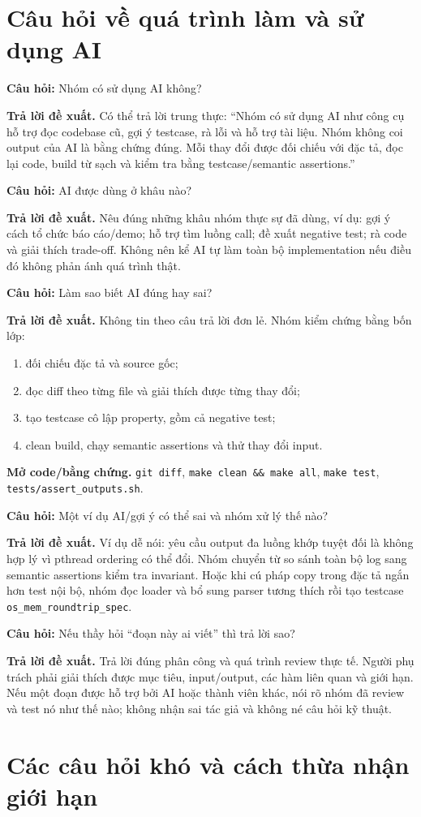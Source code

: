 \documentclass[11pt,a4paper]{article}
\newcommand{\code}[1]{\texttt{\color{navy}#1}}
\newcommand{\q}[1]{%
  \vspace{0.55em}\noindent
  \colorbox{pale}{\parbox{\dimexpr\textwidth-2\fboxsep}{\textbf{\color{navy}Câu hỏi:} #1}}%
  \par\vspace{0.3em}}
\newcommand{\ans}[1]{\textbf{\color{cyan}Trả lời đề xuất.} #1\par}
\newcommand{\proofcode}[1]{\textbf{\color{orange}Mở code/bằng chứng.} #1\par}
\begin{document}
\section{Câu hỏi về quá trình làm và sử dụng AI}

\q{Nhóm có sử dụng AI không?}
\ans{Có thể trả lời trung thực: ``Nhóm có sử dụng AI như công cụ hỗ trợ đọc
codebase cũ, gợi ý testcase, rà lỗi và hỗ trợ tài liệu. Nhóm không coi output
của AI là bằng chứng đúng. Mỗi thay đổi được đối chiếu với đặc tả, đọc lại code,
build từ sạch và kiểm tra bằng testcase/semantic assertions.''}

\q{AI được dùng ở khâu nào?}
\ans{Nêu đúng những khâu nhóm thực sự đã dùng, ví dụ: gợi ý cách tổ chức báo
cáo/demo; hỗ trợ tìm luồng call; đề xuất negative test; rà code và giải thích
trade-off. Không nên kể AI tự làm toàn bộ implementation nếu điều đó không phản
ánh quá trình thật.}

\q{Làm sao biết AI đúng hay sai?}
\ans{Không tin theo câu trả lời đơn lẻ. Nhóm kiểm chứng bằng bốn lớp:
\begin{enumerate}
  \item đối chiếu đặc tả và source gốc;
  \item đọc diff theo từng file và giải thích được từng thay đổi;
  \item tạo testcase cô lập property, gồm cả negative test;
  \item clean build, chạy semantic assertions và thử thay đổi input.
\end{enumerate}}
\proofcode{\code{git diff}, \code{make clean \&\& make all},
\code{make test}, \code{tests/assert\_outputs.sh}.}

\q{Một ví dụ AI/gợi ý có thể sai và nhóm xử lý thế nào?}
\ans{Ví dụ dễ nói: yêu cầu output đa luồng khớp tuyệt đối là không hợp lý vì
pthread ordering có thể đổi. Nhóm chuyển từ so sánh toàn bộ log sang semantic
assertions kiểm tra invariant. Hoặc khi cú pháp copy trong đặc tả ngắn hơn
test nội bộ, nhóm đọc loader và bổ sung parser tương thích rồi tạo testcase
\code{os\_mem\_roundtrip\_spec}.}

\q{Nếu thầy hỏi ``đoạn này ai viết'' thì trả lời sao?}
\ans{Trả lời đúng phân công và quá trình review thực tế. Người phụ trách phải
giải thích được mục tiêu, input/output, các hàm liên quan và giới hạn. Nếu một
đoạn được hỗ trợ bởi AI hoặc thành viên khác, nói rõ nhóm đã review và test nó
như thế nào; không nhận sai tác giả và không né câu hỏi kỹ thuật.}

\section{Các câu hỏi khó và cách thừa nhận giới hạn}
\end{document}
